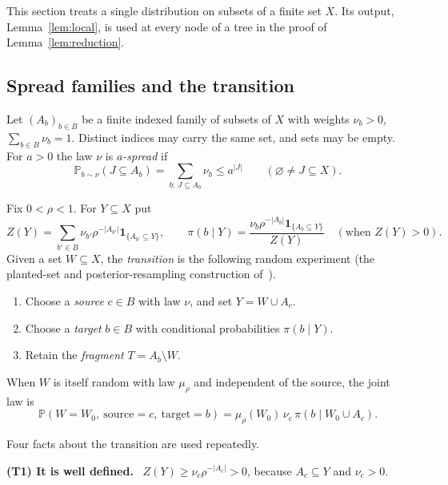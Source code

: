\documentclass[11pt]{article}
\numberwithin{equation}{section}
\theoremstyle{remark}
\newcommand{\PP}{\mathbb P}
\newcommand{\ind}{\mathbf 1}
\newcommand{\step}[1]{\par\medskip\noindent\textbf{#1}\ }
\begin{document}
This section treats a single distribution on subsets of a finite set
$X$. Its output, Lemma~\ref{lem:local}, is used at every node of a tree
in the proof of Lemma~\ref{lem:reduction}.

\subsection{Spread families and the transition}

Let $(A_b)_{b\in B}$ be a finite indexed family of subsets of $X$ with
weights $\nu_b>0$, $\sum_{b\in B}\nu_b=1$. Distinct indices may carry
the same set, and sets may be empty. For $a>0$ the law $\nu$ is
\emph{$a$-spread} if
\begin{equation}\label{eq:spread}
 \PP_{b\sim\nu}(J\subseteq A_b)=\sum_{b:\,J\subseteq A_b}\nu_b\le a^{|J|}
 \qquad(\varnothing\ne J\subseteq X).
\end{equation}

Fix $0<\rho<1$. For $Y\subseteq X$ put
\begin{equation}\label{eq:posterior}
 Z(Y)=\sum_{b'\in B}\nu_{b'}\rho^{-|A_{b'}|}\ind_{\{A_{b'}\subseteq Y\}},
 \qquad
 \pi(b\mid Y)=\frac{\nu_b\rho^{-|A_b|}\ind_{\{A_b\subseteq Y\}}}{Z(Y)}
 \quad(\text{when }Z(Y)>0).
\end{equation}
Given a set $W\subseteq X$, the \emph{transition} is the following
random experiment (the planted-set and posterior-resampling construction
of~\cite[Sections~2.1--2.3]{MNSZ25}).
\begin{enumerate}[label=\arabic*.,leftmargin=2em,itemsep=2pt]
 \item Choose a \emph{source} $c\in B$ with law $\nu$, and set
 $Y=W\cup A_c$.
 \item Choose a \emph{target} $b\in B$ with conditional probabilities
 $\pi(b\mid Y)$.
 \item Retain the \emph{fragment} $T=A_b\setminus W$.
\end{enumerate}
When $W$ is itself random with law $\mu_\rho$ and independent of the
source, the joint law is
\begin{equation}\label{eq:joint}
 \PP(W=W_0,\ \mathrm{source}=c,\ \mathrm{target}=b)
 =\mu_\rho(W_0)\,\nu_c\,\pi(b\mid W_0\cup A_c).
\end{equation}

Four facts about the transition are used repeatedly.

\step{(T1) It is well defined.} $Z(Y)\ge\nu_c\rho^{-|A_c|}>0$, because
$A_c\subseteq Y$ and $\nu_c>0$.
\end{document}
